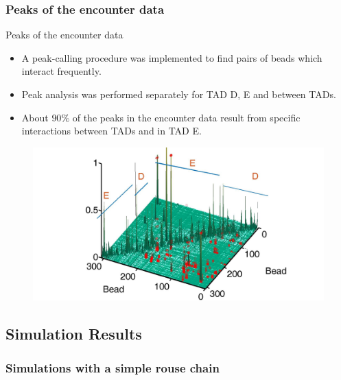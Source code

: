 \documentclass[8pt]{beamer}
\begin{document}
\subsubsection{Peaks of the encounter data}\label{subsubsection_peaksOfTheEncounterData}

\begin{frame}{Peaks of the encounter data}
\begin{itemize}
\item A peak-calling procedure was implemented to find pairs of beads which interact frequently. 
\item Peak analysis was performed separately for TAD D, E and between TADs. 
\item About $90\%$ of the peaks in the encounter data result from specific interactions between TADs and in TAD E.
\end{itemize}
\begin{figure}[H]
\includegraphics[scale=0.15]{peakListAverage}
\end{figure}

\end{frame}

\subsection{Simulation Results}\label{subsection_simulationResults}

\subsubsection{Simulations with a simple rouse chain}\label{subsubsection_simulationWithSimpleRouse}
\end{document}

